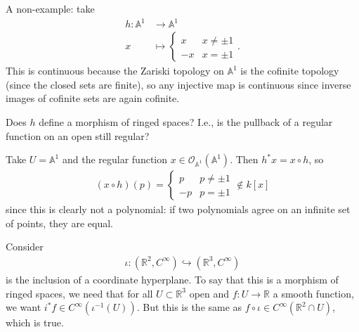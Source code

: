 \begin{example}

A non-example: take
\begin{align*}  
h: {\mathbb{A}}^1 &\to {\mathbb{A}}^1 \\
x & \mapsto 
\begin{cases}
x & x \neq \pm 1 \\
-x & x= \pm 1
\end{cases}
.\end{align*}
This is continuous because the Zariski topology on \({\mathbb{A}}^1\) is
the cofinite topology (since the closed sets are finite), so any
injective map is continuous since inverse images of cofinite sets are
again cofinite.

\begin{question}

Does \(h\) define a morphism of ringed spaces? I.e., is the pullback of
a regular function on an open still regular?

\end{question}

\begin{answer}

Take \(U = {\mathbb{A}}^1\) and the regular function
\(x\in {\mathcal{O}}_{{\mathbb{A}}^1}({\mathbb{A}}^1)\). Then
\(h^*x = x\circ h\), so
\begin{align*}  
(x\circ h)(p) =
\begin{cases}
p & p\neq \pm 1 \\
-p & p= \pm 1 
\end{cases}
\not \in k[x]
\end{align*}
since this is clearly not a polynomial: if two polynomials agree on an
infinite set of points, they are equal.

\end{answer}

\end{example}

\begin{example}

Consider
\begin{align*}
\iota: ({\mathbb{R}}^2, C^\infty) \hookrightarrow({\mathbb{R}}^3, C^\infty)
\end{align*}
is the inclusion of a coordinate hyperplane. To say that this is a
morphism of ringed spaces, we need that for all
\(U\subset {\mathbb{R}}^3\) open and \(f:U\to {\mathbb{R}}\) a smooth
function, we want \(i^* f\in C^\infty (\iota^{-1}(U))\). But this is the
same as \(f\circ \iota \in C^\infty({\mathbb{R}}^2\cap U)\), which is
true.

\end{example}

